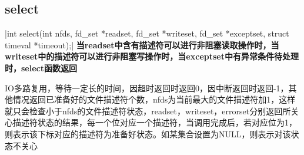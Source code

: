 \subsection{select}
|int select(int nfds, fd_set *readset, fd_set *writeset, fd_set *exceptset, struct timeval *timeout);|
\noindent \textbf{当readset中含有描述符可以进行非阻塞读取操作时，当writeset中的描述符可以进行非阻塞写操作时，当exceptset中有异常条件待处理时，select函数返回}
\begin{spacing}{2.0}
IO多路复用，等待一定长的时间，因超时返回时返回0，因中断返回时返回-1，其他情况返回已准备好的文件描述符个数，nfds为当前最大的文件描述符加1，这样就只会检查小于nfds的文件描述符状态，readset，writeset，errorset分别返回所关心描述符状态的结果，每一个位对应一个描述符，当调用完成后，若对应位为1，则表示该下标对应的描述符为准备好状态。如某集合设置为NULL，则表示对该状态不关心
\end{spacing}
